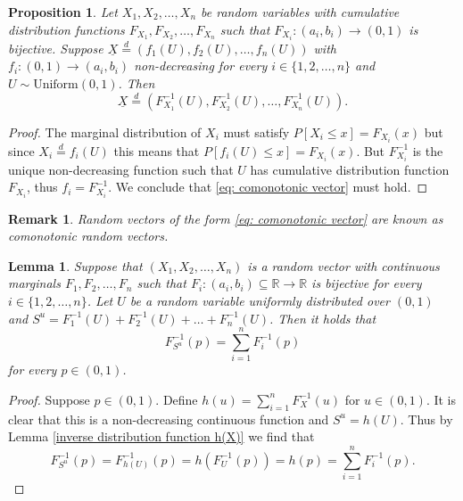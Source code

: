 \documentclass{article}
\newtheorem{proposition}{Proposition}
\newtheorem{lemma}{Lemma}
\newtheorem{remark}{Remark}
\begin{document}
\begin{proposition}\cite[Theorem 4.1.1]{Risk_Measurement}\label{prop: comonotonic vectors}
    Let $X_1,X_2,\dots,X_n$ be random variables with cumulative distribution functions $F_{X_1},F_{X_2},\dots,F_{X_n}$ such that $F_{X_i}:(a_i,b_i)\rightarrow (0,1)$ is bijective. Suppose $\underline{X} \overset{d}{=} (f_1(U),f_2(U),\dots,f_n(U))$ with $f_i: (0,1) \rightarrow (a_i,b_i)$ non-decreasing for every $i\in \{1,2,\dots,n\}$ and $U\sim \text{Uniform}(0,1)$. Then 
    \begin{equation} \label{eq: comonotonic vector}
    \underline{X} \overset{d}{=} (F_{X_1}^{-1}(U),F_{X_2}^{-1}(U),\dots,F_{X_n}^{-1}(U)).
    \end{equation}
\end{proposition}
\begin{proof}
    The marginal distribution of $X_i$ must satisfy $P[X_i \leq x] = F_{X_i}(x)$ but since $X_i\overset{d}{=}f_i(U)$ this means that $P[f_i(U) \leq x] = F_{X_i}(x)$. But $F_{X_i}^{-1}$ is the unique non-decreasing function such that $U$ has cumulative distribution function $F_{X_i}$, thus $f_i = F_{X_i}^{-1}$. We conclude that \eqref{eq: comonotonic vector} must hold.
\end{proof}
\begin{remark}
    Random vectors of the form \eqref{eq: comonotonic vector} are known as comonotonic random vectors.
\end{remark}
\begin{lemma}\cite[Theorem 4.5.1]{Risk_Measurement}\label{lemma: inverse cdf property}
    Suppose that $(X_1,X_2,\dots,X_n)$ is a random vector with continuous marginals $F_1,F_2,\dots,F_n$ such that $F_i:(a_i,b_i)\subseteq\mathbb{R}\rightarrow \mathbb{R}$ is bijective for every $i\in \{1,2,\dots,n\}$. Let $U$ be a random variable uniformly distributed over $(0,1)$ and $S^u = F_1^{-1}(U) + F_2^{-1}(U) + \dots + F_n^{-1}(U)$. Then it holds that
    \begin{equation}\label{eq: inverse cdf property}
        F_{S^u}^{-1}(p) = \sum_{i=1}^nF_i^{-1}(p)
    \end{equation}
    for every $p\in (0,1)$.
\end{lemma}
\begin{proof}
    Suppose $p\in (0,1)$. Define $h(u) = \sum_{i=1}^nF_X^{-1}(u)$ for $u\in (0,1)$. It is clear that this is a non-decreasing continuous function and $S^u = h(U)$. 
    Thus by Lemma \ref{inverse distribution function h(X)} we find that 
    $$F_{S^u}^{-1}(p) = F_{h(U)}^{-1}(p) = h\left(F_U^{-1}(p)\right) = h(p) = \sum_{i=1}^nF_i^{-1}(p).$$
\end{proof}
\end{document}
